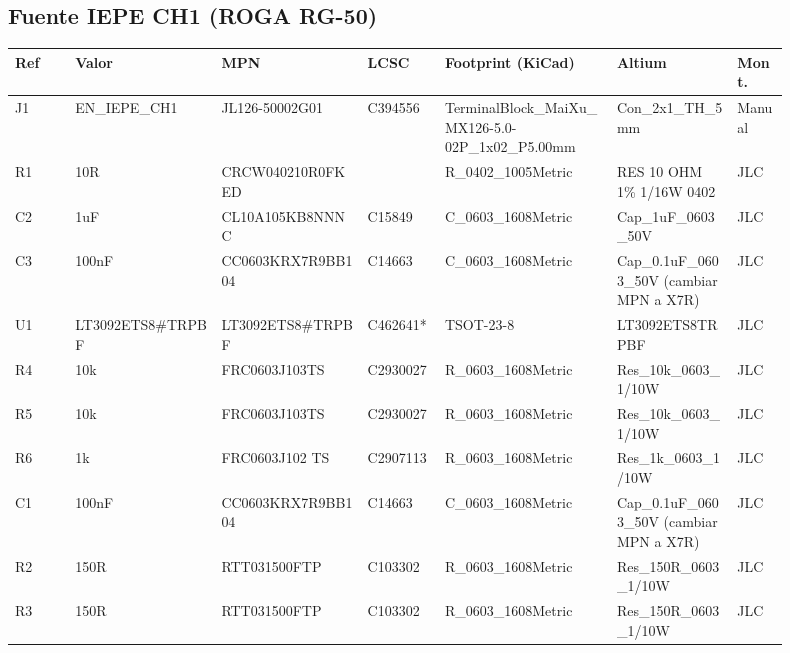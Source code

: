 \documentclass[10pt,a4paper]{article}
\begin{document}
\subsection*{Fuente IEPE CH1 (ROGA RG-50)}
{\scriptsize\begin{longtable}{@{}L{0.07\linewidth}L{0.17\linewidth}L{0.17\linewidth}L{0.09\linewidth}L{0.20\linewidth}L{0.14\linewidth}L{0.06\linewidth}@{}}\toprule
\textbf{Ref} & \textbf{Valor} & \textbf{MPN} & \textbf{LCSC} & \textbf{Footprint (KiCad)} & \textbf{Altium} & \textbf{Mont.}\\\midrule\endhead
J1 & EN\_\allowbreak{}IEPE\_\allowbreak{}CH1 & JL126-50002G01 & C394556 & TerminalBlock\_\allowbreak{}MaiXu\_\allowbreak{}MX126-5.0-02P\_\allowbreak{}1x02\_\allowbreak{}P5.00mm & Con\_\allowbreak{}2x1\_\allowbreak{}TH\_\allowbreak{}5mm & Manual\\
R1 & 10R & CRCW040210R0FKED &  & R\_\allowbreak{}0402\_\allowbreak{}1005Metric & RES 10 OHM 1\% 1/16W 0402 & JLC\\
C2 & 1uF & CL10A105KB8NNNC & C15849 & C\_\allowbreak{}0603\_\allowbreak{}1608Metric & Cap\_\allowbreak{}1uF\_\allowbreak{}0603\_\allowbreak{}50V & JLC\\
C3 & 100nF & CC0603KRX7R9BB104 & C14663 & C\_\allowbreak{}0603\_\allowbreak{}1608Metric & Cap\_\allowbreak{}0.1uF\_\allowbreak{}0603\_\allowbreak{}50V (cambiar MPN a X7R) & JLC\\
U1 & LT3092ETS8\#TRPBF & LT3092ETS8\#TRPBF & C462641* & TSOT-23-8 & LT3092ETS8TRPBF & JLC\\
R4 & 10k & FRC0603J103TS & C2930027 & R\_\allowbreak{}0603\_\allowbreak{}1608Metric & Res\_\allowbreak{}10k\_\allowbreak{}0603\_\allowbreak{}1/10W & JLC\\
R5 & 10k & FRC0603J103TS & C2930027 & R\_\allowbreak{}0603\_\allowbreak{}1608Metric & Res\_\allowbreak{}10k\_\allowbreak{}0603\_\allowbreak{}1/10W & JLC\\
R6 & 1k & FRC0603J102 TS & C2907113 & R\_\allowbreak{}0603\_\allowbreak{}1608Metric & Res\_\allowbreak{}1k\_\allowbreak{}0603\_\allowbreak{}1/10W & JLC\\
C1 & 100nF & CC0603KRX7R9BB104 & C14663 & C\_\allowbreak{}0603\_\allowbreak{}1608Metric & Cap\_\allowbreak{}0.1uF\_\allowbreak{}0603\_\allowbreak{}50V (cambiar MPN a X7R) & JLC\\
R2 & 150R & RTT031500FTP & C103302 & R\_\allowbreak{}0603\_\allowbreak{}1608Metric & Res\_\allowbreak{}150R\_\allowbreak{}0603\_\allowbreak{}1/10W & JLC\\
R3 & 150R & RTT031500FTP & C103302 & R\_\allowbreak{}0603\_\allowbreak{}1608Metric & Res\_\allowbreak{}150R\_\allowbreak{}0603\_\allowbreak{}1/10W & JLC\\

\end{longtable}}
\end{document}
